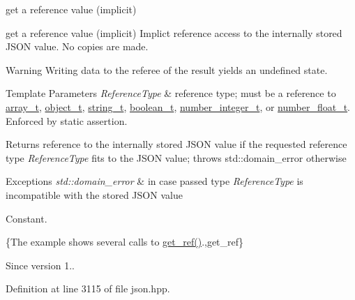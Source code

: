 get a reference value (implicit) 

get a reference value (implicit) Implict reference access to the internally stored J\+S\+O\+N value. No copies are made.

\begin{DoxyWarning}{Warning}
Writing data to the referee of the result yields an undefined state.
\end{DoxyWarning}

\begin{DoxyTemplParams}{Template Parameters}
{\em Reference\+Type} & reference type; must be a reference to \hyperlink{classnlohmann_1_1basic__json_ab00b882d39306d663c23dab110f5cae0}{array\+\_\+t}, \hyperlink{classnlohmann_1_1basic__json_a0ac9894c9de8dc551cf2e5f1c605537f}{object\+\_\+t}, \hyperlink{classnlohmann_1_1basic__json_ab63e618bbb0371042b1bec17f5891f42}{string\+\_\+t}, \hyperlink{classnlohmann_1_1basic__json_af3bc3e83aa162d7ba4df16a949872723}{boolean\+\_\+t}, \hyperlink{classnlohmann_1_1basic__json_ac4b10b2364f26ce47bdb9a413ff04a59}{number\+\_\+integer\+\_\+t}, or \hyperlink{classnlohmann_1_1basic__json_a74a0013e847fdc574b48f931f0e757e1}{number\+\_\+float\+\_\+t}. Enforced by static assertion.\\
\hline
\end{DoxyTemplParams}
\begin{DoxyReturn}{Returns}
reference to the internally stored J\+S\+O\+N value if the requested reference type {\itshape Reference\+Type} fits to the J\+S\+O\+N value; throws std\+::domain\+\_\+error otherwise
\end{DoxyReturn}

\begin{DoxyExceptions}{Exceptions}
{\em std\+::domain\+\_\+error} & in case passed type {\itshape Reference\+Type} is incompatible with the stored J\+S\+O\+N value\\
\hline
\end{DoxyExceptions}
Constant.

\{The example shows several calls to {\ttfamily \hyperlink{classnlohmann_1_1basic__json_a4f332e90f3cae562d0c3fa6ba48f74f9}{get\+\_\+ref()}}.,get\+\_\+ref\}

\begin{DoxySince}{Since}
version 1.. 
\end{DoxySince}


Definition at line 3115 of file json.\+hpp.

\hypertarget{classnlohmann_1_1basic__json_aef496a56163710084e13612ab73e6ed2}{}
